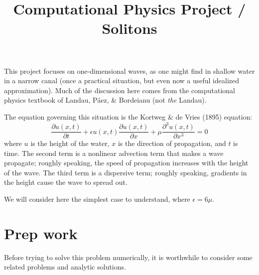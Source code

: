 \documentclass[11pt, preprint]{aastex}
\begin{document}
\title{\bf Computational Physics Project / Solitons}

This project focuses on one-dimensional waves, as one might find in
shallow water in a narrow canal (once a practical situation, but even
now a useful idealized approximation). Much of the discussion here
comes from the computational physics textbook of Landau, P{\'a}ez, \&
Bordeianu (not {\it the} Landau).

The equation governing this situation is the Kortweg \& de Vries
(1895) equation:
\begin{equation}
\label{eq:soliton}
\frac{\partial u(x,t)}{\partial t} + \epsilon u(x,t) \frac{\partial
  u(x,t)}{\partial x} + \mu \frac{\partial^3 u(x,t)}{\partial x^3} = 0
\end{equation}
where $u$ is the height of the water, $x$ is the direction of
propagation, and $t$ is time. The second term is a nonlinear advection
term that makes a wave propagate; roughly speaking, the speed of
propagation increases with the height of the wave. The third term is a
dispersive term; roughly speaking, gradients in the height cause the
wave to spread out.

We will consider here the simplest case to understand, where $\epsilon
= 6 \mu$.

\section{Prep work}

Before trying to solve this problem numerically, it is worthwhile to
consider some related problems and analytic solutions. 
\end{document}
